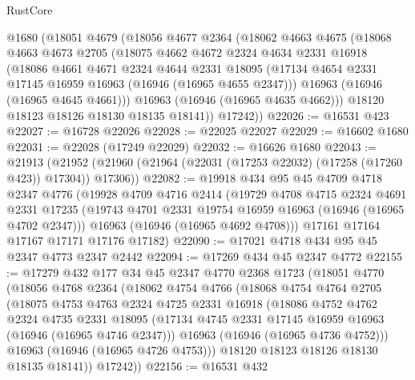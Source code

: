 \begin{lexlean}{RustCore}
\begin{coremodule}
    @1680
    (@18051
      @4679
      (@18056
        @4677
        @2364
        (@18062
          @4663
          @4675
          (@18068
            @4663
            @4673
            @2705
            (@18075
              @4662
              @4672
              @2324
              @4634
              @2331
              @16918
              (@18086
                @4661
                @4671
                @2324
                @4644
                @2331
                @18095
                (@17134 @4654 @2331 @17145 @16959 @16963 (@16946 (@16965 @4655 @2347)))
                @16963
                (@16946 (@16965 @4645 @4661)))
              @16963
              (@16946 (@16965 @4635 @4662)))
            @18120
            @18123
            @18126
            @18130
            @18135
            @18141))
        @17242))
@22026 := @16531 @423
@22027 := @16728 @22026
@22028 := @22025 @22027
@22029 := @16602 @1680
@22031 := @22028 (@17249 @22029)
@22032 := @16626 @1680
@22043 := @21913
    (@21952 (@21960 (@21964 (@22031 (@17253 @22032) (@17258 (@17260 @423)) @17304)) @17306))
@22082 := @19918
    @434
    @95
    @45
    @4709
    @4718
    @2347
    @4776
    (@19928
      @4709
      @4716
      @2414
      (@19729
        @4708
        @4715
        @2324
        @4691
        @2331
        @17235
        (@19743 @4701 @2331 @19754 @16959 @16963 (@16946 (@16965 @4702 @2347)))
        @16963
        (@16946 (@16965 @4692 @4708)))
      @17161
      @17164
      @17167
      @17171
      @17176
      @17182)
@22090 := @17021 @4718 @434 @95 @45 @2347 @4773 @2347 @2442
@22094 := @17269 @434 @45 @2347 @4772
@22155 := @17279
    @432
    @177
    @34
    @45
    @2347
    @4770
    @2368
    @1723
    (@18051
      @4770
      (@18056
        @4768
        @2364
        (@18062
          @4754
          @4766
          (@18068
            @4754
            @4764
            @2705
            (@18075
              @4753
              @4763
              @2324
              @4725
              @2331
              @16918
              (@18086
                @4752
                @4762
                @2324
                @4735
                @2331
                @18095
                (@17134 @4745 @2331 @17145 @16959 @16963 (@16946 (@16965 @4746 @2347)))
                @16963
                (@16946 (@16965 @4736 @4752)))
              @16963
              (@16946 (@16965 @4726 @4753)))
            @18120
            @18123
            @18126
            @18130
            @18135
            @18141))
        @17242))
@22156 := @16531 @432

\end{coremodule}
\end{lexlean}
